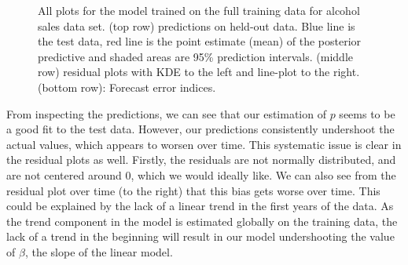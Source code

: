 \documentclass{article}
\begin{document}
\begin{figure}[H]
    \centering
    \quad
    \quad
    \caption{All plots for the model trained on the full training data for alcohol sales data set. (top row) predictions on held-out data. Blue line is the test data, red line is the point estimate (mean) of the posterior predictive and shaded areas are 95\% prediction intervals. (middle row) residual plots with KDE to the left and line-plot to the right. (bottom row): Forecast error indices. }
\end{figure}

From inspecting the predictions, we can see that our estimation of $p$ seems to be a good fit to the test data. However, our predictions consistently undershoot the actual values, which appears to worsen over time. This systematic issue is clear in the residual plots as well. Firstly, the residuals are not normally distributed, and are not centered around 0, which we would ideally like. We can also see from the residual plot over time (to the right) that this bias gets worse over time. This could be explained by the lack of a linear trend in the first years of the data. As the trend component in the model is estimated globally on the training data, the lack of a trend in the beginning will result in our model undershooting the value of $\beta$, the slope of the linear model. 
\end{document}
